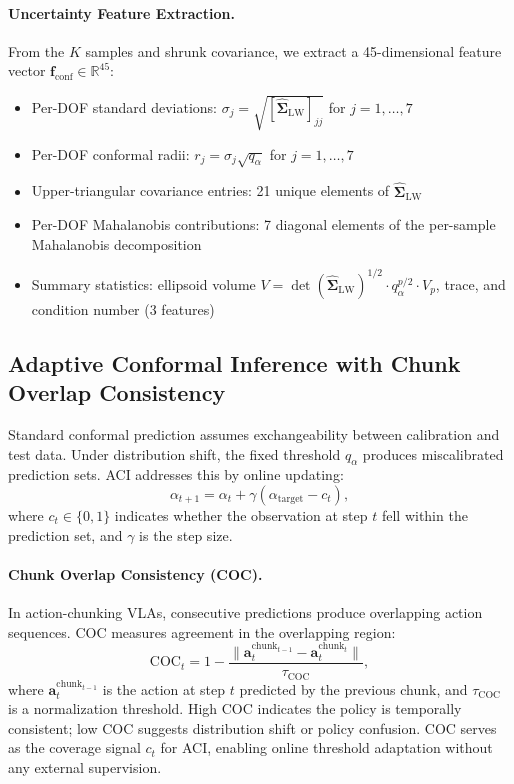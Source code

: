 \documentclass[10pt,twocolumn]{article}
\begin{document}
\paragraph{Uncertainty Feature Extraction.}
From the $K$ samples and shrunk covariance, we extract a 45-dimensional feature vector $\mathbf{f}_{\mathrm{conf}} \in \mathbb{R}^{45}$:
\begin{itemize}
    \item Per-DOF standard deviations: $\sigma_j = \sqrt{[\hat{\boldsymbol{\Sigma}}_{\mathrm{LW}}]_{jj}}$ for $j=1,\ldots,7$
    \item Per-DOF conformal radii: $r_j = \sigma_j \sqrt{q_\alpha}$ for $j=1,\ldots,7$
    \item Upper-triangular covariance entries: 21 unique elements of $\hat{\boldsymbol{\Sigma}}_{\mathrm{LW}}$
    \item Per-DOF Mahalanobis contributions: 7 diagonal elements of the per-sample Mahalanobis decomposition
    \item Summary statistics: ellipsoid volume $V = \det(\hat{\boldsymbol{\Sigma}}_{\mathrm{LW}})^{1/2} \cdot q_\alpha^{p/2} \cdot V_p$, trace, and condition number (3 features)
\end{itemize}

\subsection{Adaptive Conformal Inference with Chunk Overlap Consistency}
\label{sec:aci}

Standard conformal prediction assumes exchangeability between calibration and test data. Under distribution shift, the fixed threshold $q_\alpha$ produces miscalibrated prediction sets. ACI addresses this by online updating:
\begin{equation}
\alpha_{t+1} = \alpha_t + \gamma(\alpha_{\mathrm{target}} - c_t),
\end{equation}
where $c_t \in \{0,1\}$ indicates whether the observation at step $t$ fell within the prediction set, and $\gamma$ is the step size.

\paragraph{Chunk Overlap Consistency (COC).}
In action-chunking VLAs, consecutive predictions produce overlapping action sequences. COC measures agreement in the overlapping region:
\begin{equation}
\mathrm{COC}_t = 1 - \frac{\|\mathbf{a}_{t}^{\mathrm{chunk}_{t-1}} - \mathbf{a}_{t}^{\mathrm{chunk}_{t}}\|}{\tau_{\mathrm{COC}}},
\end{equation}
where $\mathbf{a}_{t}^{\mathrm{chunk}_{t-1}}$ is the action at step $t$ predicted by the previous chunk, and $\tau_{\mathrm{COC}}$ is a normalization threshold.
High COC indicates the policy is temporally consistent; low COC suggests distribution shift or policy confusion.
COC serves as the coverage signal $c_t$ for ACI, enabling online threshold adaptation without any external supervision.
\end{document}

